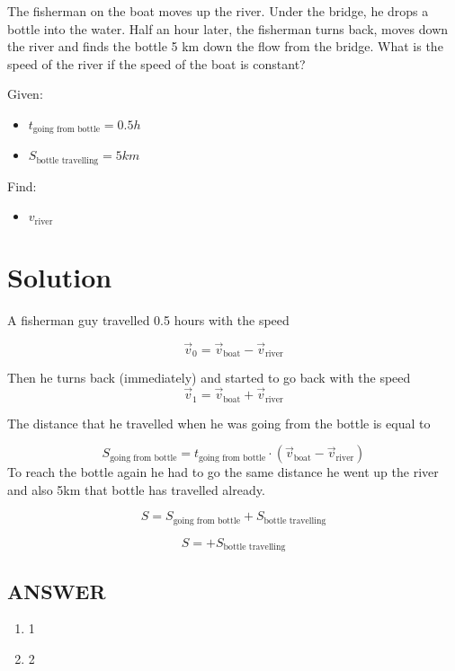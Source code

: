 The fisherman on the boat moves up the river. Under the bridge, he drops a bottle into the water.
Half an hour later, the fisherman turns back, moves down the river and finds the bottle 5 km
down the flow from the bridge. What is the speed of the river if the speed of the boat is constant?

\bigbreak Given: \begin{itemize}
    \item $t_{\text{going from bottle}} = 0.5h$
    \item $S_{\text{bottle travelling}} = 5km$
\end{itemize}

Find: \begin{itemize}
    \item $v_{\text{river}}$
\end{itemize}

\section*{Solution}

A fisherman guy travelled 0.5 hours with the speed

$$\Vec{v}_0 = \Vec{v}_{\text{boat}} - \Vec{v}_{\text{river}}$$

Then he turns back (immediately) and started to go back with the speed
$$\Vec{v}_1 = \Vec{v}_{\text{boat}} + \Vec{v}_{\text{river}}$$

The distance that he travelled when he was going from the bottle is equal to

$$S_{\text{going from bottle}} = t_{\text{going from bottle}} \cdot (\Vec{v}_{\text{boat}} - \Vec{v}_{\text{river}})$$
To reach the bottle again he had to go the same distance he went up the river and also 5km that bottle has travelled already.

$$S = S_{\text{going from bottle}} + S_{\text{bottle travelling}}$$

$$S =  + S_{\text{bottle travelling}}$$


\vfill
\subsection*{ANSWER}
\begin{enumerate}
    \item 1
    \item 2
\end{enumerate}

